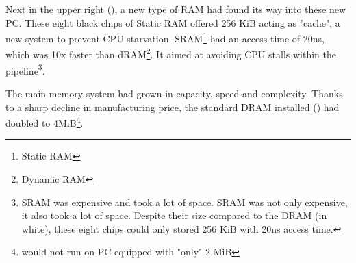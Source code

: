 \par
 Next in the upper right (), a new type of RAM had found its way into these new PC. These eight black chips of Static RAM offered 256 KiB acting as "cache", a new system to prevent CPU starvation. SRAM\footnote{Static RAM} had an access time of 20ns, which was 10x faster than dRAM\footnote{Dynamic RAM}. It aimed at avoiding CPU stalls within the pipeline\footnote{SRAM was expensive and took a lot of space. SRAM was not only expensive, it also took a lot of space. Despite their size compared to the DRAM (in white), these eight chips could only stored 256 KiB with 20ns access time.}. \\
\par
The main memory system had grown in capacity, speed and complexity. Thanks to a sharp decline in manufacturing price, the standard DRAM installed () had doubled to 4MiB\footnote{\doom would not run on PC equipped with "only" 2 MiB}.


